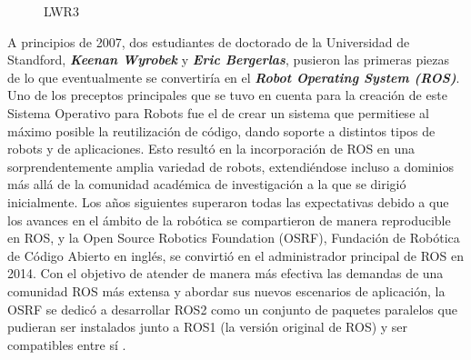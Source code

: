 \begin{itemize}
  \begin{figure}[h!]
    \begin{center}
      \subcapcentertrue
      \hspace{2mm}
    \end{center}
    \caption{LWR3}
    \label{fig:Lightweight Robot (LWR)}
  \end{figure}
  
  \pagebreak
  
  A principios de 2007, dos estudiantes de doctorado de la Universidad de Standford, \textbf{\emph{Keenan Wyrobek}} y \textbf{\emph{Eric Bergerlas}}, pusieron las primeras piezas de lo que eventualmente se convertiría en el \textbf{\emph{Robot Operating System (ROS)}}. Uno de los preceptos principales que se tuvo en cuenta para la creación de este Sistema Operativo para Robots fue el de crear un sistema que permitiese al máximo posible la reutilización de código, dando soporte a distintos tipos de robots y de aplicaciones. Esto resultó en la incorporación de ROS en una sorprendentemente amplia variedad de robots, extendiéndose incluso a dominios más allá de la comunidad académica de investigación a la que se dirigió inicialmente. Los años siguientes superaron todas las expectativas debido a que los avances en el ámbito de la robótica se compartieron de manera reproducible en ROS, y la Open Source Robotics Foundation (OSRF), Fundación de Robótica de Código Abierto en inglés, se convirtió en el administrador principal de ROS en 2014. Con el objetivo de atender de manera más efectiva las demandas de una comunidad ROS más extensa y abordar sus nuevos escenarios de aplicación, la OSRF se dedicó a desarrollar ROS2 como un conjunto de paquetes paralelos que pudieran ser instalados junto a ROS1 (la versión original de ROS) y ser compatibles entre sí \cite{Suarez22}.
  

\end{itemize}
